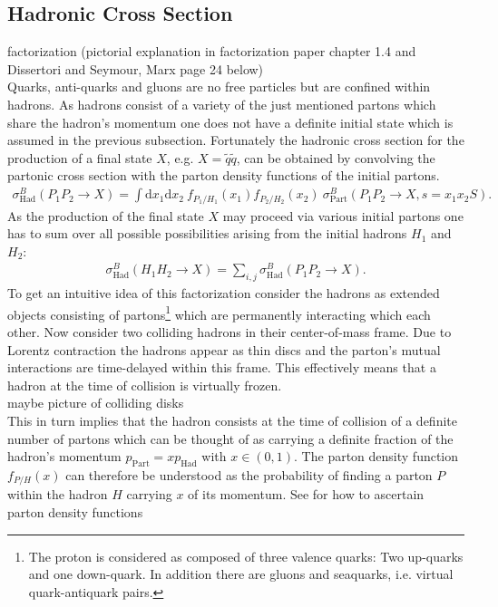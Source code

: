 \subsection{Hadronic Cross Section}
factorization (pictorial explanation in factorization paper chapter 1.4 and Dissertori and Seymour, Marx page 24 below)\\
Quarks, anti-quarks and gluons are no free particles but are confined within hadrons. As hadrons consist of a variety of the just mentioned partons which share the hadron's momentum one does not have a definite initial state which is assumed in the previous subsection. Fortunately the hadronic cross section for the production of a final state $X$, e.g. $X = \tilde{q} \tilde{q}$, can be obtained by convolving the partonic cross section with the parton density functions of the initial partons.
\begin{align}
\sigma^B_{\mathrm{Had}}(P_1 P_2 \to X) = \int \mbox{d}x_1 \mbox{d}x_2\ f_{P_1/H_1}(x_1) f_{P_2/H_2}(x_2)\ \sigma^B_{\mathrm{Part}} (P_1 P_2 \to X, s = x_ 1x_2 S).
\end{align}
As the production of the final state $X$ may proceed via various initial partons one has to sum over all possible possibilities arising from the initial hadrons $H_1$ and $H_2$:
\begin{align}
\sigma^B_{\mathrm{Had}}(H_1 H_2 \to X) = \sum_{i,j} \sigma^B_{\mathrm{Had}}(P_1 P_2 \to X).
\end{align}
To get an intuitive idea of this factorization consider the hadrons as extended objects consisting of partons\footnote{The proton is considered as composed of three valence quarks: Two up-quarks and one down-quark. In addition there are gluons and seaquarks, i.e. virtual quark-antiquark pairs.} which are permanently interacting which each other. Now consider two colliding hadrons in their center-of-mass frame. Due to Lorentz contraction the hadrons appear as thin discs and the parton's mutual interactions are time-delayed within this frame. This effectively means that a hadron at the time of collision is virtually frozen.\\
maybe picture of colliding disks\\
This in turn implies that the hadron consists at the time of collision of a definite number of partons which can be thought of as carrying a definite fraction of the hadron's momentum $p_{\mathrm{Part}} = x p_{\mathrm{Had}}$ with $x \in \left(0, 1 \right)$. The parton density function $f_{P/H}(x)$ can therefore be understood as the probability of finding a parton $P$ within the hadron $H$ carrying $x$ of its momentum. See \cite{Brock:1993sz} for how to ascertain parton density functions\\
